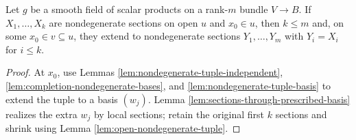 \begin{lemma}
\label{lem:extend-nondegenerate-family}





Let $g$ be a smooth field of scalar products on a rank-$m$ bundle $V\to B$. If $X_1,\ldots,X_k$ are nondegenerate sections on open $u$ and $x_0\in u$, then $k\le m$ and, on some $x_0\in v\subseteq u$, they extend to nondegenerate sections $Y_1,\ldots,Y_m$ with $Y_i=X_i$ for $i\le k$.
\end{lemma}
\begin{proof}

\sketch At $x_0$, use Lemmas \ref{lem:nondegenerate-tuple-independent}, \ref{lem:completion-nondegenerate-bases}, and \ref{lem:nondegenerate-tuple-basis} to extend the tuple to a basis $(w_j)$. Lemma \ref{lem:sections-through-prescribed-basis} realizes the extra $w_j$ by local sections; retain the original first $k$ sections and shrink using Lemma \ref{lem:open-nondegenerate-tuple}.
\end{proof}


